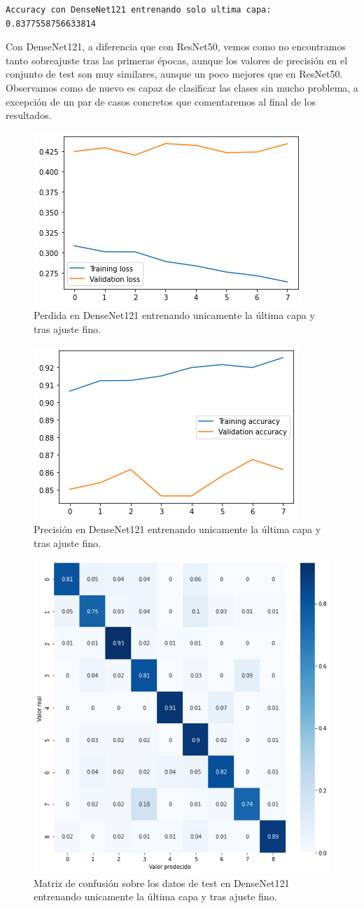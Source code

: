 \begin{lstlisting}
Accuracy con DenseNet121 entrenando solo ultima capa: 0.8377558756633814
\end{lstlisting}

Con DenseNet121, a diferencia que con ResNet50, vemos como no encontramos tanto sobreajuste tras las primeras épocas, aunque los valores de precisión en el conjunto de test son muy similares, aunque un poco mejores que en ResNet50. Observamos como de nuevo es capaz de clasificar las clases sin mucho problema, a excepción de un par de casos concretos que comentaremos al final de los resultados.



\begin{figure}[H]
  \centering
  \includegraphics[width=0.5\linewidth]{Imagenes/entrenamiento_redes/ult/densenet_fine_loss.png}
  \caption{Perdida en DenseNet121 entrenando unicamente la última capa y tras ajuste fino.}
\end{figure}

\begin{figure}[H]
  \centering
  \includegraphics[width=0.5\linewidth]{Imagenes/entrenamiento_redes/ult/densenet_fine_acc.png}
  \caption{Precisión en DenseNet121 entrenando unicamente la última capa y tras ajuste fino.}
\end{figure}

\begin{figure}[H]
  \centering
  \includegraphics[width=0.5\linewidth]{Imagenes/entrenamiento_redes/ult/densenet_fine_matriz.png}
  \caption{Matriz de confusión sobre los datos de test en DenseNet121 entrenando unicamente la última capa y tras ajuste fino.}
\end{figure}


